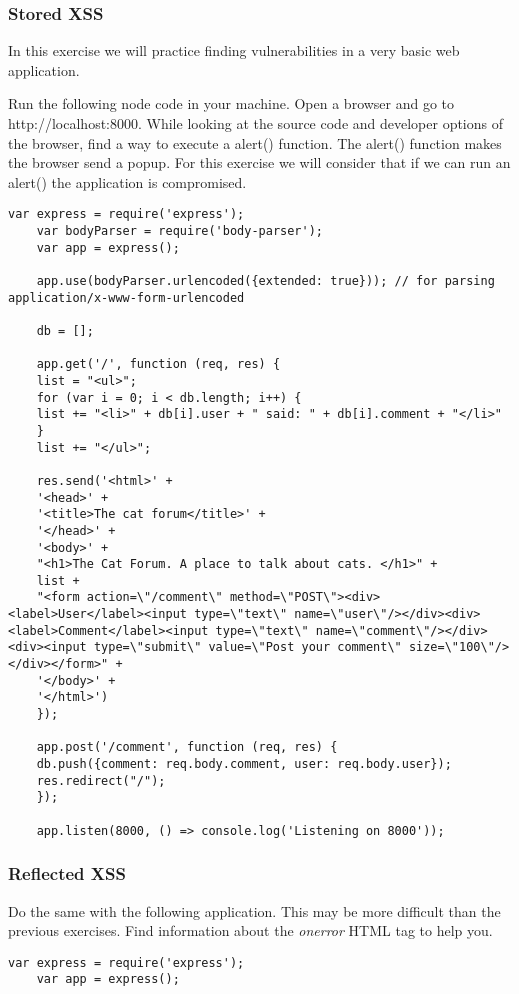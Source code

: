 
\begin{Exercise}[label={websec-xss-types}]
	\subsubsection{Stored XSS}
	In this exercise we will practice finding vulnerabilities in a very basic web application.
	
	Run the following node code in your machine. Open a browser and go to http://localhost:8000. While looking at the source code and developer options of the browser, find a way to execute a alert() function. The alert() function makes the browser send a popup. For this exercise we will consider that if we can run an alert() the application is compromised.
	
	\begin{lstlisting}[style=JavaScript]
	var express = require('express');
	var bodyParser = require('body-parser');
	var app = express();

	app.use(bodyParser.urlencoded({extended: true})); // for parsing application/x-www-form-urlencoded
	
	db = [];
	
	app.get('/', function (req, res) {
	list = "<ul>";
	for (var i = 0; i < db.length; i++) {
	list += "<li>" + db[i].user + " said: " + db[i].comment + "</li>"
	}
	list += "</ul>";
	
	res.send('<html>' +
	'<head>' +
	'<title>The cat forum</title>' +
	'</head>' +
	'<body>' +
	"<h1>The Cat Forum. A place to talk about cats. </h1>" +
	list +
	"<form action=\"/comment\" method=\"POST\"><div><label>User</label><input type=\"text\" name=\"user\"/></div><div><label>Comment</label><input type=\"text\" name=\"comment\"/></div><div><input type=\"submit\" value=\"Post your comment\" size=\"100\"/></div></form>" +
	'</body>' +
	'</html>')
	});
	
	app.post('/comment', function (req, res) {
	db.push({comment: req.body.comment, user: req.body.user});
	res.redirect("/");
	});
	
	app.listen(8000, () => console.log('Listening on 8000'));
	\end{lstlisting}
	
	\subsubsection{Reflected XSS}
		Do the same with the following application. This may be more difficult than the previous exercises. Find information about the \textit{onerror} HTML tag to help you.
	\begin{lstlisting}[style=JavaScript]
	var express = require('express');
	var app = express();
	

\end{lstlisting}
\end{Exercise}
